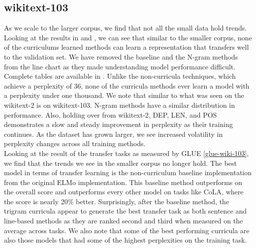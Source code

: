 \subsection{wikitext-103}
As we scale to the larger corpus, we find that not all the small data hold trends. Looking at the results in  and , we can see that similar to the smaller corpus, none of the curriculums learned methods can learn a representation that transfers well to the validation set. We have removed the baseline and the N-gram methods from the line chart as they made understanding model performance difficult. Complete tables are available in . Unlike the non-curricula techniques, which achieve a perplexity of 36, none of the curricula methods ever learn a model with a perplexity under one thousand. We note that similar to what was seen on the wikitext-2 is on wikitext-103. N-gram methods have a similar distribution in performance. Also, holding over from wikitext-2, DEP, LEN, and POS demonstrates a slow and steady improvement in perplexity as their training continues. As the dataset has grown larger, we see increased volatility in perplexity changes across all training methods.\\
Looking at the result of the transfer tasks as measured by GLUE \ref{glue-wiki-103}, we find that the trends we see in the smaller corpus no longer hold. The best model in terms of transfer learning is the non-curriculum baseline implementation from the original ELMo implementation. This baseline method outperforms on the overall score and outperforms every other model on tasks like CoLA, where the score is nearly 20\% better. Surprisingly, after the baseline method, the trigram curricula appear to generate the best transfer task as both sentence and line-based methods as they are ranked second and third when measured on the average across tasks. We also note that some of the best performing curricula are also those models that had some of the highest perplexities on the training task.

